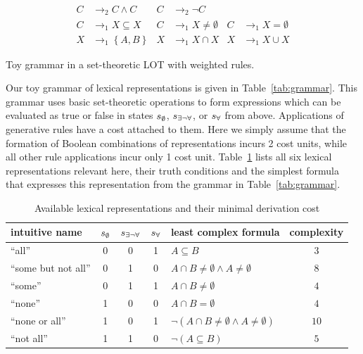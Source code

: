 \documentclass[a4paper, 11pt]{article}
\theoremstyle{Satz}
\newcommand{\set}[1]{\left\{#1\right\}}
\newcommand{\state}{\ensuremath{s}\xspace}		%
\newcommand{\mystate}[1]{\ensuremath{\state_{\text{#1}}}\xspace} %
\newcommand{\ssome}{\mystate{\ensuremath{\exists\neg\forall}}}
\newcommand{\sall}{\mystate{\ensuremath{\forall}}}
\newcommand{\snone}{\mystate{\ensuremath{\emptyset}}}
\begin{document}
\begin{table}
  \centering
  \begin{align*}
    C & \rightarrow_2 C \wedge C 
    & C & \rightarrow_2 \neg C  \\ 
    C & \rightarrow_1 X \subseteq X &
    C & \rightarrow_1 X \neq \emptyset &
    C & \rightarrow_1 X = \emptyset  \\
    X & \rightarrow_1 \set{A,B} & 
    X & \rightarrow_1 X \cap X & 
    X & \rightarrow_1 X \cup X    
  \end{align*}
  \caption{Toy grammar in a set-theoretic LOT with weighted rules.}
  \label{tab:grammar}
\end{table}

Our toy grammar of lexical representations is given in Table~\ref{tab:grammar}. This grammar uses basic
set-theoretic operations to form expressions which can be evaluated as true or false in states
$\snone$, $\ssome$, or $\sall$ from above. Applications of generative rules have a cost attached
to them. Here we simply assume that the formation of Boolean combinations of representations incurs 2
cost units, while all other rule applications incur only 1 cost unit. Table~\ref{tab:concepts}
lists all six lexical representations relevant here, their truth conditions and the simplest formula that
expresses this representation from the grammar in Table~\ref{tab:grammar}.

\begin{table}
  \centering
\begin{center}
  \begin{tabular}{lccclc}
    \toprule
    intuitive name
    & \snone
    & \ssome
    & \sall
    & least complex formula
    & complexity
    \\ \midrule
    ``all''
    & 0
    & 0
    & 1
    & $A \subseteq B$
    & $3$
    \\
    ``some but not all''
    & 0
    & 1
    & 0
    & $A \cap B \neq \emptyset \wedge A \neq \emptyset$
    & $8$
    \\    
    ``some''
    & 0
    & 1
    & 1
    & $A \cap B \neq \emptyset$
    & $4$
    \\
    ``none''
    & 1
    & 0
    & 0
    & $A \cap B = \emptyset$
    & $4$
    \\
    ``none or all''
    & 1
    & 0
    & 1
    & $\neg(A \cap B \neq \emptyset \wedge A \neq \emptyset)$
    & $10$
    \\
    ``not all''
    & 1
    & 1
    & 0
    & $\neg (A \subseteq B)$
    & $5$
    \\
    \bottomrule
  \end{tabular}
\end{center}
\caption{Available lexical representations and their minimal derivation cost}
\label{tab:concepts}
\end{table}
\end{document}
